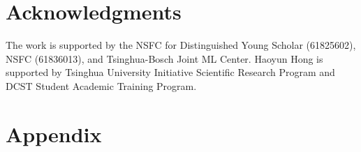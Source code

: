 \section*{Acknowledgments}
The work is supported by the NSFC for Distinguished Young Scholar (61825602), NSFC (61836013), and Tsinghua-Bosch Joint ML Center.
Haoyun Hong is supported by Tsinghua University Initiative Scientific
Research Program and DCST Student Academic Training Program. 


\renewcommand\refname{REFERENCES}



\clearpage

\appendix

\section{Appendix}






\endinput



\section{INTRODUCTION} \label{sec:intr}


Knowledge graphs (KGs) have found widespread adoption in various Web applications, such as search~\cite{eder2012knowledge,paulheim2017knowledge}, recommendation~\cite{guo2020survey,li2020alimekg}, and question answering~\cite{yang2018hotpotqa,lewis2020retrieval}.  
Constructing large-scale KGs has been a very challenging task.
While we can extract new facts from scratch, aligning existing (incomplete) KGs together is practically necessary for real-world application scenarios. 
Over the past years, the problem of entity alignment~\cite{GCN-Align,tang2019bert-int}, or namely ontology mapping~\cite{li2008rimom} and schema matching~\cite{li2014rule}, has been a fundamental problem for \hhy{the Web research community}.

